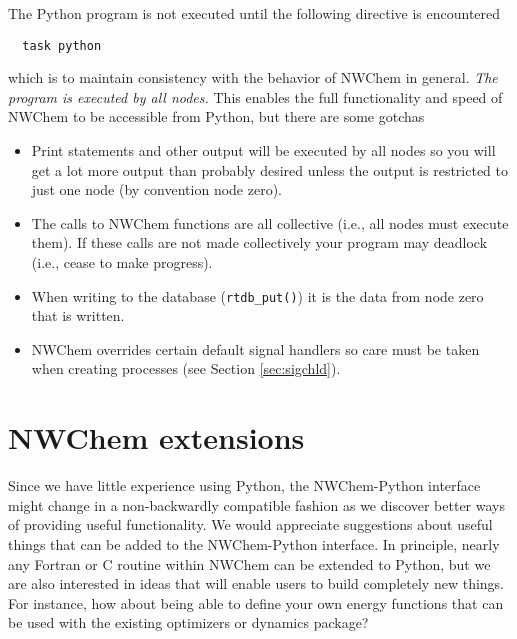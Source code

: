The Python program is not executed until the following directive
is encountered
\begin{verbatim}
  task python
\end{verbatim}
which is to maintain consistency with the behavior of NWChem in general.
{\em The program is executed by all nodes.}  This enables the full functionality and speed of NWChem to be accessible from Python, but there are some gotchas
\begin{itemize}
\item Print statements and other output will be executed by all nodes
so you will get a lot more output than probably desired unless the
output is restricted to just one node (by convention node zero).
\item The calls to NWChem functions are all collective (i.e., all
nodes must execute them).  If these calls are not made collectively
your program may deadlock (i.e., cease to make progress).

\item When writing to the database (\verb+rtdb_put()+) it is the data
from node zero that is written.

\item NWChem overrides certain default signal handlers so care
must be taken when creating processes (see Section \ref{sec:sigchld}).
\end{itemize}

\section{NWChem extensions}

Since we have little experience using Python, the NWChem-Python
interface might change in a non-backwardly compatible fashion as we
discover better ways of providing useful functionality.  We would
appreciate suggestions about useful things that can be added to the
NWChem-Python interface.  In principle, nearly any Fortran or C
routine within NWChem can be extended to Python, but we are also
interested in ideas that will enable users to build completely new
things.  For instance, how about being able to define your own energy
functions that can be used with the existing optimizers or dynamics
package?

